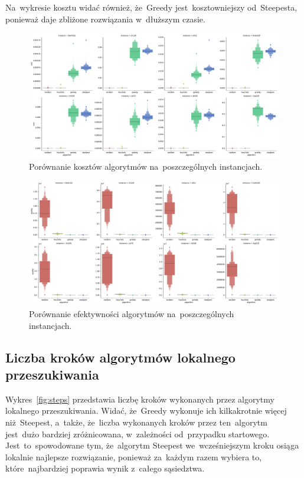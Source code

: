 Na~wykresie kosztu widać również, że~Greedy jest~kosztowniejszy od~Steepesta, ponieważ daje zbliżone rozwiązania w~dłuższym czasie.

\begin{figure}
\begin{center}
\includegraphics[width=1.0\textwidth]{graphs/cost_comparison_letval.pdf}
\end{center}
\caption{Porównanie kosztów algorytmów na~poszczególnych instancjach.}
\label{fig:cost}
\end{figure}

\begin{figure}
\begin{center}
\includegraphics[width=1.0\textwidth]{graphs/quality_comparison_letval.pdf}
\end{center}
\caption{Porównanie efektywności algorytmów na~poszczególnych instancjach.}
\label{fig:quality}
\end{figure}

\subsection{Liczba kroków algorytmów lokalnego przeszukiwania}

Wykres~\ref{fig:steps} przedstawia liczbę kroków wykonanych przez algorytmy lokalnego przeszukiwania. Widać, że~Greedy wykonuje ich kilkakrotnie więcej niż~Steepest, a~także, że~liczba wykonanych kroków przez ten~algorytm jest~dużo bardziej zróżnicowana, w~zależności od~przypadku startowego. Jest~to~spowodowane tym, że~algorytm Steepest we~wcześniejszym kroku osiąga lokalnie najlepsze rozwiązanie, ponieważ za~każdym razem wybiera to, które~najbardziej poprawia wynik z~całego sąsiedztwa.

